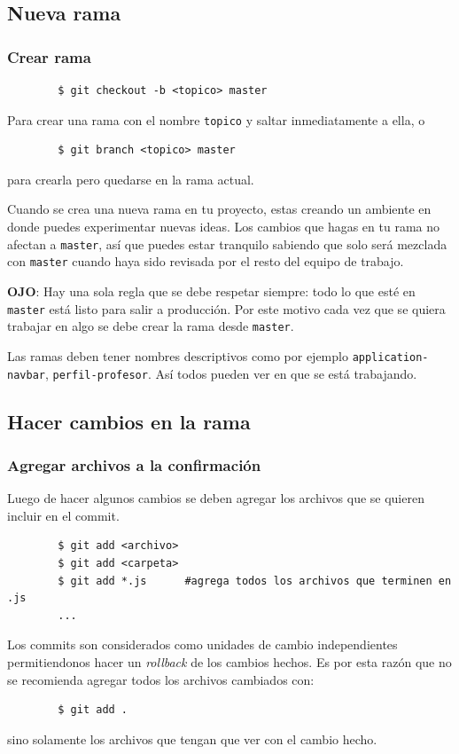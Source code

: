 \documentclass[10pt]{beamer}
\begin{document}
\subsection{Nueva rama}
\begin{frame}
	\frametitle{Crear rama}

	\begin{lstlisting}
		$ git checkout -b <topico> master
	\end{lstlisting}

	Para crear una rama con el nombre \texttt{topico} y saltar inmediatamente a 
	ella, o

	\begin{lstlisting}
		$ git branch <topico> master
	\end{lstlisting}

	para crearla pero quedarse en la rama actual.

	Cuando se crea una nueva rama en tu proyecto, estas creando un ambiente en 
	donde puedes experimentar nuevas ideas. Los cambios que hagas en tu rama no 
	afectan a \texttt{master}, así que puedes estar tranquilo sabiendo que solo 
	será mezclada con \texttt{master} cuando haya sido revisada por el resto 
	del equipo de trabajo.

	\textbf{OJO}: Hay una sola regla que se debe respetar siempre: todo lo que 
	esté en \texttt{master} está listo para salir a producción. Por este motivo 
	cada vez que se quiera trabajar en algo se debe crear la rama desde 
	\texttt{master}.

	Las ramas deben tener nombres descriptivos como por ejemplo 
	\texttt{application-navbar}, \texttt{perfil-profesor}. Así todos pueden ver 
	en que se está trabajando.
\end{frame} 

\subsection{Hacer cambios en la rama}
\begin{frame}[fragile]
	\frametitle{Agregar archivos a la confirmación}

	Luego de hacer algunos cambios se deben agregar los archivos que se quieren 
	incluir en el commit.

	\begin{lstlisting}
		$ git add <archivo>
		$ git add <carpeta>
		$ git add *.js      #agrega todos los archivos que terminen en .js
		...
	\end{lstlisting}

	Los commits son considerados como unidades de cambio independientes 
	permitiendonos hacer un \emph{rollback} de los cambios hechos. Es por esta 
	razón que no se recomienda agregar todos los archivos cambiados con:


	\begin{lstlisting}
		$ git add .
	\end{lstlisting}

	sino solamente los archivos que tengan que ver con el cambio hecho.
\end{frame} 
\end{document}
